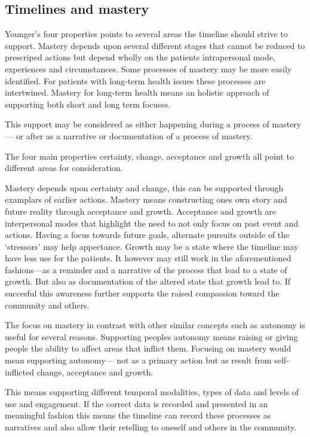 \documentclass[../MasterThesis.tex]{subfiles}
\begin{document}
\subsection{Timelines and mastery}

Younger's four properties points to several areas the timeline should strive to support. Mastery depends upon several different stages that cannot be reduced to prescriped actions but depend wholly on the patients intrapersonal mode, experiences and circumstances. Some processes of mastery may be more easily identified. For patients with long-term health issues these processes are intertwined. Mastery for long-term health means an holistic approach of supporting both short and long term focuses. 

This support may be considered as either happening during a process of mastery--- or after as a narrative or documentation of a process of mastery.   

The four main properties certainty, change, acceptance and growth all point to different areas for consideration. 

Mastery depends upon certainty and change, this can be supported through examplars of earlier actions. Mastery means constructing ones own story and future reality through acceptance and growth. Acceptance and growth are interpersonal modes that highlight the need to not only focus on past event and actions. Having a focus towards future goals, alternate pursuits outside of the `stressors' may help appectance. Growth may be a state where the timeline may have less use for the patients. It however may still work in the aforementioned fashions---as a reminder and a narrative of the process that lead to a state of growth. But also as documentation of the altered state that growth lead to. If succesful this awareness further supports the raised compassion toward the community and others. 

The focus on mastery in contrast with other similar concepts such as autonomy is useful for several reasons. Supporting peoples autonomy means raising or giving people the ability to affect areas that inflict them. Focusing on mastery would mean supporting autonomy--- not as a primary action but as result from self-inflicted change, acceptance and growth. 

This means supporting different temporal modalities, types of data and levels of use and engagement. If the correct data is recorded and presented in an meaningful fashion this means the timeline can record these processes as narratives and also allow their retelling to oneself and others in the community. 
\end{document}
